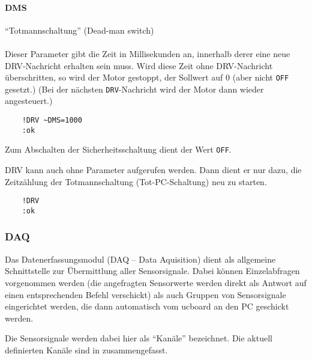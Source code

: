 \paragraph{DMS}

{\color[rgb]{0.75,0.75,0.75}
"`Totmannschaltung"' (Dead-man switch)\\
\\
Dieser Parameter gibt die Zeit in Millisekunden an, innerhalb derer eine neue DRV-Nachricht erhalten sein muss. Wird diese Zeit ohne DRV-Nachricht überschritten, so wird der Motor gestoppt, \dah der Sollwert auf 0 (aber nicht \texttt{OFF} gesetzt.) (Bei der nächsten \texttt{DRV}-Nachricht wird der Motor dann wieder angesteuert.)

\begin{verbatim}
	!DRV ~DMS=1000
	:ok
\end{verbatim}
\textcolor[rgb]{0.75,0.75,0.75}{
Zum Abschalten der Sicherheitsschaltung dient der Wert \texttt{OFF}.}


DRV kann auch ohne Parameter aufgerufen werden. Dann dient er nur dazu, die Zeitzählung der Totmannschaltung (\bzw Tot-PC-Schaltung) neu zu starten.

\begin{verbatim}
	!DRV
	:ok
\end{verbatim}
}


\subsubsection{DAQ}

Das Datenerfassungsmodul (DAQ -- Data Aquisition) dient als allgemeine Schnittstelle zur Übermittlung aller Sensorsignale. Dabei können Einzelabfragen vorgenommen werden (die angefragten Sensorwerte werden direkt als Antwort auf einen entsprechenden Befehl verschickt) als auch Gruppen von Sensorsignale eingerichtet werden, die dann automatisch vom ucboard an den PC geschickt werden.

Die Sensorsignale werden dabei hier als "`Kanäle"' bezeichnet. Die aktuell definierten Kanäle sind in  zusammengefasst.

